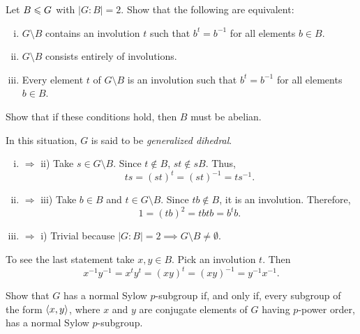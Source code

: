 \begin{probl}
    Let\/ $B\leqslant G$ with\/ $|G:B|=2$. Show that the following are equivalent:
    \begin{enumerate}[i),font=\upshape]
    \item $G\setminus B$ contains an involution\/ $t$ such that\/ $b^t=b^{-1}$ for all elements $b\in B$.
    \item $G\setminus B$ consists entirely of involutions.
    \item Every element\/ $t$ of\/ $G\setminus B$ is an involution such that\/ $b^t=b^{-1}$ for all elements\/ $b\in B$.
    \end{enumerate}
    Show that if these conditions hold, then\/ $B$ must be abelian.

    \textrm{ In this situation, $G$ is said to be \textsl{generalized dihedral}.}
\end{probl}

\begin{solution}
\begin{enumerate}[i),font=\upshape]
    \item $\Rightarrow$ ii) Take $s\in G\setminus B$. Since $t\notin B$, $st\notin sB$. Thus,
    $$
        ts=(st)^t=(st)^{-1}=ts^{-1}.
    $$

    \item $\Rightarrow$ iii) Take $b\in B$ and $t\in G\setminus B$. Since $tb\notin B$, it is an involution. Therefore,
    $$
        1 = (tb)^2 = tbtb = b^tb.
    $$

    \item $\Rightarrow$ i) Trivial because $|G:B|=2\implies G\setminus B\ne\emptyset$.
\end{enumerate}

To see the last statement take $x,y\in B$. Pick an involution $t$. Then
$$
    x^{-1}y^{-1}=x^ty^t = (xy)^t = (xy)^{-1}=y^{-1}x^{-1}.
$$
 \end{solution}

\begin{probl}
    Show that\/ $G$ has a normal Sylow\/ $p$-subgroup if, and only if, every subgroup of the form\/ $\langle x,y\rangle$, where\/ $x$ and\/ $y$ are conjugate elements of\/ $G$ having\/ $p$-power order, has a normal Sylow\/ $p$-subgroup.
\end{probl}

